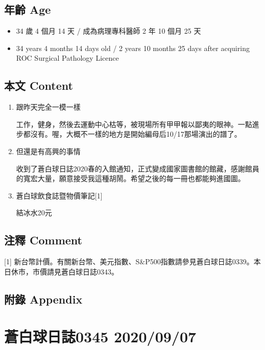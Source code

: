 \documentclass[
]{article}
\providecommand{\tightlist}{%
  \setlength{\itemsep}{0pt}\setlength{\parskip}{0pt}}
\begin{document}
\hypertarget{ux5e74ux9f61-age-5}{%
\subsection{年齡 Age}\label{ux5e74ux9f61-age-5}}

\begin{itemize}
\tightlist
\item
  34 歲 4 個月 14 天 / 成為病理專科醫師 2 年 10 個月 25 天
\item
  34 years 4 months 14 days old / 2 years 10 months 25 days after
  acquiring ROC Surgical Pathology Licence
\end{itemize}

\hypertarget{ux672cux6587-content-5}{%
\subsection{本文 Content}\label{ux672cux6587-content-5}}

\begin{enumerate}
\def\labelenumi{\arabic{enumi}.}
\item
  跟昨天完全一模一樣

  工作，健身，然後去運動中心枯等，被現場所有甲甲報以鄙夷的眼神。一點進步都沒有。喔，大概不一樣的地方是開始編母后10/17那場演出的譜了。
\item
  但還是有高興的事情

  收到了蒼白球日誌2020春的入館通知，正式變成國家圖書館的館藏，感謝館員的寬宏大量，願意接受我這種胡鬧。希望之後的每一冊也都能夠進國圖。
\item
  蒼白球飲食誌暨物價筆記{[}1{]}

  結冰水20元
\end{enumerate}

\hypertarget{ux6ce8ux91cb-comment-5}{%
\subsection{注釋 Comment}\label{ux6ce8ux91cb-comment-5}}

{[}1{]}
新台幣計價。有關新台幣、美元指數、S\&P500指數請參見蒼白球日誌0339。本日休市，市價請見蒼白球日誌0343。

\hypertarget{ux9644ux9304-appendix-5}{%
\subsection{附錄 Appendix}\label{ux9644ux9304-appendix-5}}

\hypertarget{ux84bcux767dux7403ux65e5ux8a8c0345-20200907}{%
\section{蒼白球日誌0345
2020/09/07}\label{ux84bcux767dux7403ux65e5ux8a8c0345-20200907}}
\end{document}

